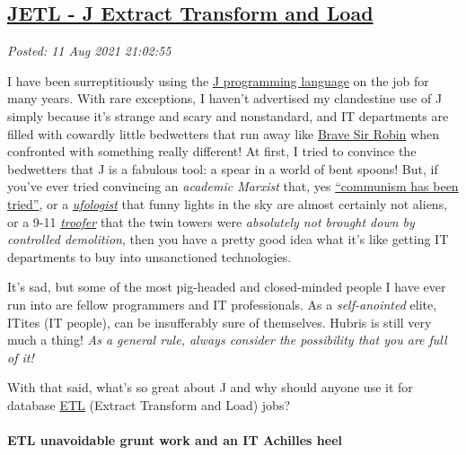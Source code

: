 %

\subsection*{\href{http://analyzethedatanotthedrivel.org/2021/08/11/jetl-j-extract-transform-and-load/}{JETL - J Extract Transform and Load}}


\noindent\emph{Posted: 11 Aug 2021 21:02:55}
\vspace{6pt}

    I have been surreptitiously using the
\href{https://code.jsoftware.com/wiki/NuVoc}{J programming language} on
the job for many years. With rare exceptions, I haven't advertised my
clandestine use of J simply because it's strange and scary and
nonstandard, and IT departments are filled with cowardly little
bedwetters that run away like
\href{https://www.youtube.com/watch?v=BZwuTo7zKM8}{Brave Sir Robin} when
confronted with something really different! At first, I tried to
convince the bedwetters that J is a fabulous tool: a spear in a world of
bent spoons! But, if you've ever tried convincing an \emph{academic
Marxist} that, yes
\href{https://www.quora.com/Why-do-communists-insist-that-real-communism-has-never-been-tried?share=1}{``communism
has been tried''}, or a \href{https://www.urbandictionary.com/define.php?term=Ufologist}{\emph{ufologist}} that funny lights in the sky are
almost certainly not aliens, or a 9-11 \href{https://www.urbandictionary.com/define.php?term=troofer}{\emph{troofer}} that the twin
towers were \emph{absolutely not brought down by controlled demolition},
then you have a pretty good idea what it's like getting IT departments
to buy into unsanctioned technologies.

It's sad, but some of the most pig-headed and closed-minded people I
have ever run into are fellow programmers and IT professionals. As a
\emph{self-anointed} elite, ITites (IT people), can be insufferably sure
of themselves. Hubris is still very much a thing! \emph{As a general
rule, always consider the possibility that you are full of it!}

With that said, what's so great about J and why should anyone use it for
database \href{https://www.ibm.com/cloud/learn/etl}{ETL} (Extract
Transform and Load) jobs?

    \hypertarget{etl-unavoidable-grunt-work-and-an-it-achilles-heel}{%
\paragraph{ETL unavoidable grunt work and an IT Achilles
heel}\label{etl-unavoidable-grunt-work-and-an-it-achilles-heel}}

